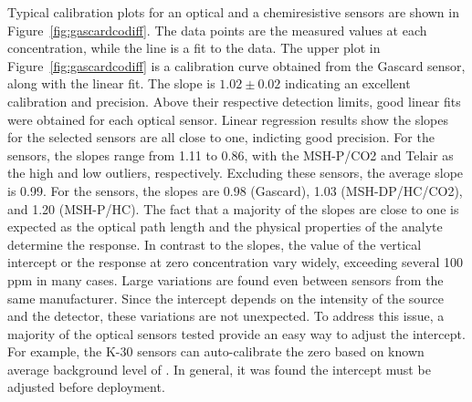 \documentclass[sensors,article,submit,moreauthors,pdftex]{Definitions/mdpi}
\begin{document}
			Typical calibration plots for an optical and a chemiresistive sensors are shown in Figure~\ref{fig:gascardcodiff}.
			The data points are the measured values at each concentration, while the line is a fit to the data.
			The upper plot in Figure~\ref{fig:gascardcodiff} is a calibration curve obtained from the Gascard sensor, along with the linear fit.
			The slope is $1.02\pm 0.02$ indicating an excellent calibration and precision.
			Above their respective detection limits, good linear fits were obtained for each optical sensor.
			Linear regression results show the slopes for the selected sensors are all close to one, indicting good precision.
			For the  sensors, the slopes range from 1.11 to 0.86, with the MSH-P/CO2 and Telair as the high and low outliers, respectively.
			Excluding these sensors, the average slope is 0.99.
			For the  sensors, the slopes are 0.98 (Gascard), 1.03 (MSH-DP/HC/CO2), and 1.20 (MSH-P/HC).
			The fact that a majority of the slopes are close to one is expected as the optical path length and the physical properties of the analyte determine the response.
			In contrast to the slopes, the value of the vertical intercept or the response at zero concentration vary widely, exceeding several 100 ppm in many cases.
			Large variations are found even between sensors from the same manufacturer.
			Since the intercept depends on the intensity of the source and the detector, these variations are not unexpected.
			To address this issue, a majority of the optical sensors tested provide an easy way to adjust the intercept.
			For example, the K-30 sensors can auto-calibrate the zero based on known average background level of .
			In general, it was found the intercept must be adjusted before deployment.
			
\end{document}
